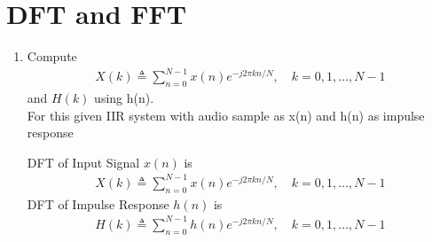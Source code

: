 \documentclass[journal,12pt,twocolumn]{IEEEtran}
\renewcommand\thesection{\arabic{section}}
\begin{document}
\section{DFT and FFT}
\begin{enumerate}[label=\thesection.\arabic*
,ref=\thesection.\theenumi]
\item Compute
\begin{align}
        X(k) \triangleq \sum_{n=0}^{N-1} x(n) e^{-j 2 \pi k n / N}, \quad k=0,1, \ldots, N-1
\end{align}
and $H(k)$ using h(n).
\\
\solution
For this given IIR system with audio sample as x(n) and h(n) as impulse response 

DFT of Input Signal $x(n)$ is 
\begin{align}
    X(k) \triangleq \sum_{n=0}^{N-1} x(n) e^{-j 2 \pi k n / N}, \quad k=0,1, \ldots, N-1
\end{align}
DFT of Impulse Response $h(n)$ is 
\begin{align}
    H(k) \triangleq \sum_{n=0}^{N-1} h(n) e^{-j 2 \pi k n / N}, \quad k=0,1, \ldots, N-1
\end{align}


\end{enumerate}
\end{document}
